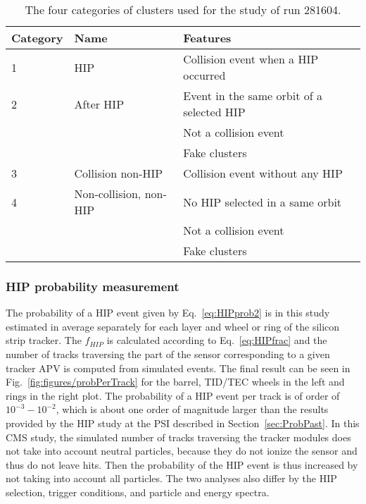 \begin{table}[h]
\begin{center}
\begin{tabular}{|l|l|l|}
\hline
Category & Name  & Features \\
\hline
1 & HIP & Collision event when a HIP occurred \\
\hline
2 & After HIP & Event in the same orbit of a selected HIP \\
& & Not a collision event \\
& & Fake clusters \\
\hline
3 & Collision non-HIP & Collision event without any HIP \\
\hline
4 & Non-collision, non-HIP  & No HIP selected in a same orbit \\
& & Not a collision event \\
& & Fake clusters \\
\hline
\end{tabular}
\caption[Table caption text]{The four categories of clusters used for the study of run 281604. }
\label{tab:eventCategories}
\end{center}
\end{table}


\subsubsection{HIP probability measurement~\label{sec:HIPprob}}

The probability of a HIP event given by Eq.~\ref{eq:HIPprob2} is in this study estimated in average separately for each layer and wheel or ring of the silicon strip tracker.  The $f_{HIP}$ is calculated according to Eq.~\ref{eq:HIPfrac} and the number of tracks traversing the part of the sensor corresponding to a given tracker APV is computed from simulated events. The final result can be seen in Fig.~\ref{fig:figures/probPerTrack} for the barrel, TID/TEC wheels in the left and rings in the right plot. The probability of a HIP event per track is of order of $10^{-3}-10^{-2}$, which is about one order of magnitude larger than the results provided by the HIP study at the PSI described in Section~\ref{sec:ProbPast}. In this CMS study, the simulated number of tracks traversing the tracker modules does not take into account neutral particles, because they do not ionize the sensor and thus do not leave hits. Then the probability of the HIP event is thus increased by not taking into account all particles. The two analyses also differ by the HIP selection, trigger conditions, and particle and energy spectra.

